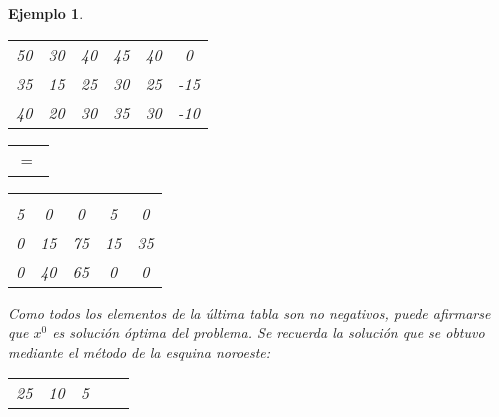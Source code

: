 \documentclass[11pt]{report}
\theoremstyle{mytheorem}
\theoremstyle{mydefinition}
\theoremstyle{myexample}
\newtheorem*{example}{Ejemplo}
\begin{document}
\begin{example}
\begin{center}
\begin{tabular}{cccccc}
    \multicolumn{1}{|c}{50} & \multicolumn{1}{c}{30} & \multicolumn{1}{c}{40} &  \multicolumn{1}{c}{45} & \multicolumn{1}{c|}{40} & \multicolumn{1}{c}{0} \\

    \multicolumn{1}{|c}{35} & \multicolumn{1}{c}{15} & \multicolumn{1}{c}{25} &  \multicolumn{1}{c}{30} & \multicolumn{1}{c|}{25} & \multicolumn{1}{c}{-15} \\
    
    \multicolumn{1}{|c}{40} & \multicolumn{1}{c}{20} & \multicolumn{1}{c}{30} &  \multicolumn{1}{c}{35} & \multicolumn{1}{c|}{30} & \multicolumn{1}{c}{-10} \\[2pt] \cline{1-5}
\end{tabular}
\begin{tabular}{c}
    \multicolumn{1}{c}{} \\ 
    \multicolumn{1}{c}{} \\ 
    \multicolumn{1}{c}{$= \ $} \\ 
    \multicolumn{1}{c}{} \\ 
\end{tabular}
\begin{tabular}{ccccc}
    \multicolumn{1}{c}{} & \multicolumn{1}{c}{} & \multicolumn{1}{c}{} &  \multicolumn{1}{c}{} & \multicolumn{1}{c}{} \\
    \cline{1-5}

    \multicolumn{1}{|c}{5} & \multicolumn{1}{c}{0} & \multicolumn{1}{c}{0} &  \multicolumn{1}{c}{5} & \multicolumn{1}{c|}{0} \\

    \multicolumn{1}{|c}{0} & \multicolumn{1}{c}{15} & \multicolumn{1}{c}{75} &  \multicolumn{1}{c}{15} & \multicolumn{1}{c|}{35} \\
    
    \multicolumn{1}{|c}{0} & \multicolumn{1}{c}{40} & \multicolumn{1}{c}{65} &  \multicolumn{1}{c}{0} & \multicolumn{1}{c|}{0} \\[2pt] \cline{1-5}
\end{tabular}
\end{center}
Como todos los elementos de la última tabla son no negativos, puede afirmarse que $x^0$ es solución óptima del problema. Se recuerda la solución que se obtuvo mediante el método de la esquina noroeste:
\begin{center}
\setlength\extrarowheight{2pt}
\begin{tabular}{ccccc}
    \cline{1-5}

    \multicolumn{1}{|c}{25} & \multicolumn{1}{c}{10} & \multicolumn{1}{c}{5} &  \multicolumn{1}{c}{} & \multicolumn{1}{c|}{} \\


\end{tabular}
\end{center}
\end{example}
\end{document}
